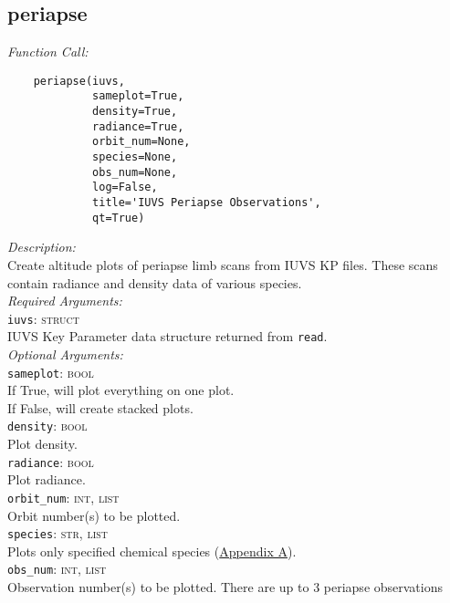 \documentclass{article}
\begin{document}
\subsection{periapse}
\label{subsec:periapse}
\vspace{-5mm}
\textit{Function Call:}\\
\vspace{-10mm}
\begin{verbatim}
    periapse(iuvs,
             sameplot=True,
             density=True,
             radiance=True,
             orbit_num=None,
             species=None,
             obs_num=None,
             log=False,
             title='IUVS Periapse Observations',
             qt=True)
\end{verbatim}
\vspace{-5mm}
\noindent
\textit{Description:}\\
\indent Create altitude plots of periapse limb scans from IUVS KP files. These scans\\
\indent contain radiance and density data of various species.\\
\textit{Required Arguments:}\\
\indent \texttt{iuvs}: \textsc{struct}\\
\indent \indent IUVS Key Parameter data structure returned from \texttt{read}.\\
\textit{Optional Arguments:}\\
\indent \texttt{sameplot}: \textsc{bool}\\
\indent \indent If True, will plot everything on one plot.\\
\indent \indent If False, will create stacked plots.\\
\indent \texttt{density}: \textsc{bool}\\
\indent \indent Plot density.\\
\indent \texttt{radiance}: \textsc{bool}\\
\indent \indent Plot radiance.\\
\indent \texttt{orbit\_num}: \textsc{int, list}\\
\indent \indent Orbit number(s) to be plotted.\\
\indent \texttt{species}: \textsc{str, list}\\
\indent \indent Plots only specified chemical species (\hyperref[sec:chemicalspecies]{Appendix A}).\\
\indent \texttt{obs\_num}: \textsc{int, list}\\
\indent \indent Observation number(s) to be plotted. There are up to 3 periapse observations\\
\end{document}
